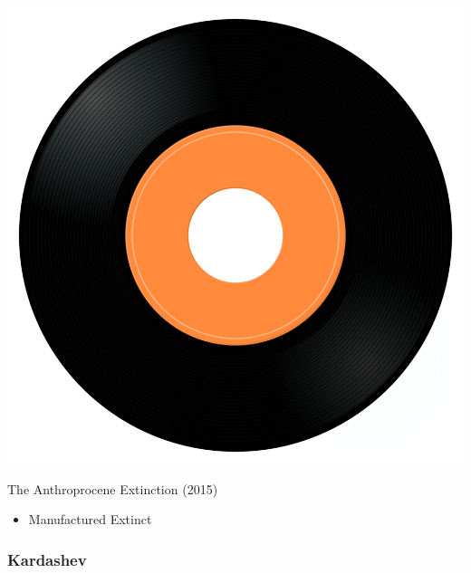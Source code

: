 \begin{minipage}[t]{0.25\textwidth}\vspace{0pt}
\captionsetup{type=figure}
\includegraphics[width=\textwidth]{Images/cover.png}
\caption*{The Anthroprocene Extinction (2015)}
\end{minipage}
\begin{minipage}[t]{0.25\textwidth}\vspace{0pt}
\begin{itemize}[nosep,leftmargin=1em,labelwidth=*,align=left]
	\setlength{\itemsep}{0pt}
	\item Manufactured Extinct
\end{itemize}
\end{minipage}

\subsubsection{Kardashev}

